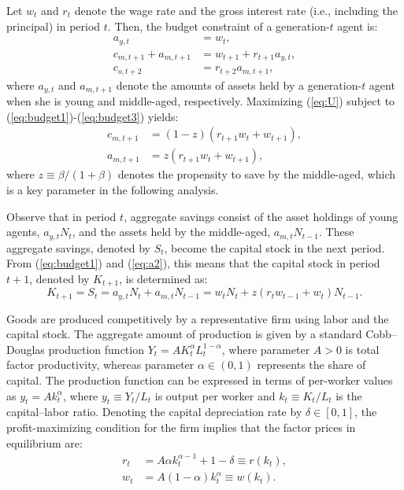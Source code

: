 \documentclass[nogrid]{MBE}%
\begin{document}
{Let $w_{t}$ and $r_{t}$ denote the wage rate and the gross interest rate
(i.e., including the principal) in period $t$. Then, the budget constraint of
a generation-$t$ agent is:%
\begin{align}
a_{y,t}  &  =w_{t},\label{eq:budget1}\\
c_{m,t+1}+a_{m,t+1}  &  =w_{t+1}+r_{t+1}a_{y,t},\label{eq:budget2}\\
c_{o,t+2}  &  =r_{t+2}a_{m,t+1}, \label{eq:budget3}%
\end{align}
where $a_{y,t}$ and $a_{m,t+1}$ denote the amounts of assets held by a
generation-$t$ agent when she is young and middle-aged, respectively.
Maximizing (\ref{eq:U}) subject to (\ref{eq:budget1})-(\ref{eq:budget3})
yields:
\begin{align}
c_{m,t+1}  &  =(1-z) \left(  r_{t+1}w_{t}+w_{t+1}\right)  ,\label{eq:c2}\\
a_{m,t+1}  &  =z \left(  r_{t+1}w_{t}+w_{t+1}\right)  , \label{eq:a2}%
\end{align}
where $z\equiv{\beta}/({1+\beta})$ denotes the propensity to save by the
middle-aged, which is a key parameter in the following analysis.

Observe that in period $t$, aggregate savings consist of the asset holdings of
young agents, $a_{y,t}N_{t}$, and the assets held by the middle-aged,
$a_{m,t}N_{t-1}$. These aggregate savings, denoted by $S_{t}$, become the
capital stock in the next period. From (\ref{eq:budget1}) and (\ref{eq:a2}),
this means that the capital stock in period $t+1$, denoted by $K_{t+1}$, is
determined as:
\begin{equation}
K_{t+1} =S_{t}= a_{y,t}N_{t}+a_{m,t}N_{t-1} =w_{t} N_{t} + z (r_{t}
w_{t-1}+w_{t})N_{t-1}. \label{eq:asset}%
\end{equation}


Goods are produced competitively by a representative firm using labor and the
capital stock. The aggregate amount of production is given by a standard
Cobb--Douglas production function $Y_{t} = AK_{t}^{\alpha}L_{t}^{1-\alpha}$,
where parameter $A>0$ is total factor productivity, whereas parameter
$\alpha\in(0,1)$ represents the share of capital. The production function can
be expressed in terms of per-worker values as $y_{t}= Ak_{t}^{\alpha}$, where
$y_{t}\equiv Y_{t}/L_{t}$ is output per worker and $k_{t}\equiv K_{t}/L_{t}$
is the capital--labor ratio. Denoting the capital depreciation rate by
$\delta\in\left[  0,1\right]  $, the profit-maximizing condition for the firm
implies that the factor prices in equilibrium are:%
\begin{align}
r_{t}  &  =A\alpha k_{t}^{\alpha-1}+1-\delta\equiv r\left(  k_{t}\right)
,\label{eq:r}\\
w_{t}  &  =A\left(  1-\alpha\right)  k_{t}^{\alpha} \equiv w\left(
k_{t}\right)  . \label{eq:w}%
\end{align}


}
\end{document}
